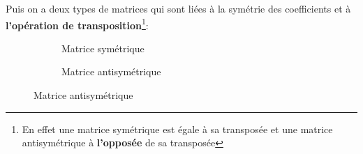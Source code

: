Puis on a deux types de matrices qui sont liées à la symétrie des coefficients et à \textbf{l'opération de transposition}\footnote[1]{En effet une matrice symétrique est égale à sa transposée et une matrice antisymétrique à \textbf{l'opposée} de sa transposée}:
\begin{figure}[h]
   \color{DarkBlue1}
   \centering
   \begin{subfigure}{.3\textwidth}
      \centering
      \caption*{\color{DarkBlue1}Matrice symétrique}
   \end{subfigure}\quad
   \begin{subfigure}{.3\textwidth}
      \centering
      \caption*{\color{DarkBlue1}Matrice antisymétrique}
   \end{subfigure}
\end{figure}

